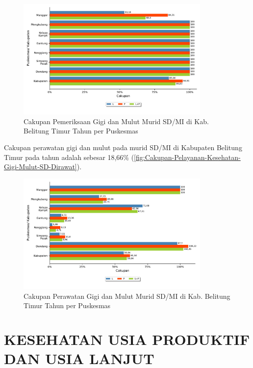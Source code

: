 \begin{figure}[H]
	\centering
	\includegraphics[width=0.85\textwidth]{bab_05/bab_05_27c_gimulSDdiperiksa}
	\caption{Cakupan Pemeriksaan Gigi dan Mulut Murid SD/MI di Kab. Belitung Timur Tahun \tP per Puskesmas}
	\label{fig:Cakupan-Pelayanan-Kesehatan-Gigi-Mulut-SD}
\end{figure}

Cakupan perawatan gigi dan mulut pada murid SD/MI di Kabupaten Belitung Timur pada tahun \tP adalah sebesar 18,66\% (\autoref{fig:Cakupan-Pelayanan-Kesehatan-Gigi-Mulut-SD-Dirawat}).

\begin{figure}[H]
	\centering
	\includegraphics[width=0.85\textwidth]{bab_05/bab_05_27d_gimulSDdirawat}
	\caption{Cakupan Perawatan Gigi dan Mulut Murid SD/MI di Kab. Belitung Timur Tahun \tP per Puskesmas}
	\label{fig:Cakupan-Pelayanan-Kesehatan-Gigi-Mulut-SD-Dirawat}
\end{figure}

\section[USIPRO DAN USILA]{KESEHATAN USIA PRODUKTIF DAN USIA LANJUT}
